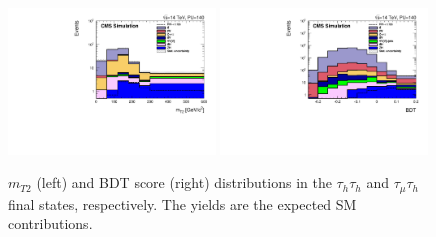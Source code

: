 \begin{figure}[hbtp]
\begin{center}
\includegraphics[width=0.49\textwidth]{figures_chapter6/thth_mt2.pdf}   
\includegraphics[width=0.49\textwidth]{figures_chapter6/tmth_bdt.pdf}
\caption{$m_{T2}$ (left) and BDT score (right) distributions in  the $\tau_{h}\tau_{h}$ and  $\tau_{\mu}\tau_{h}$ final states, respectively. The yields are the expected SM contributions.}
\label{fig:bdtout}
\end{center}
\end{figure}


